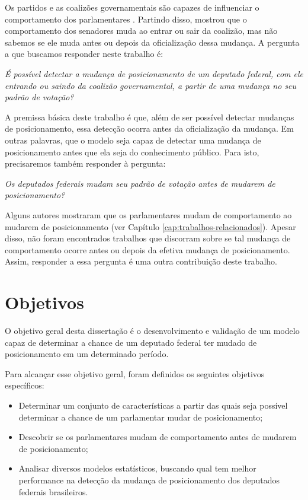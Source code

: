 Os partidos e as coalizões governamentais são capazes de influenciar o
comportamento dos parlamentares \cite{Figueiredo2001,Santos2003}. Partindo
disso,  mostrou que o comportamento dos senadores muda ao
entrar ou sair da coalizão, mas não sabemos se ele muda antes ou depois da
oficialização dessa mudança. A pergunta a que buscamos responder neste trabalho
é:

\emph{É possível detectar a mudança de posicionamento de um deputado federal,
com ele entrando ou saindo da coalizão governamental, a partir de uma mudança
no seu padrão de votação?}

A premissa básica deste trabalho é que, além de ser possível detectar mudanças
de posicionamento, essa detecção ocorra antes da oficialização da mudança. Em
outras palavras, que o modelo seja capaz de detectar uma mudança de
posicionamento antes que ela seja do conhecimento público. Para isto,
precisaremos também responder à pergunta:

\emph{Os deputados federais mudam seu padrão de votação antes de mudarem de
posicionamento?}

Alguns autores mostraram que os parlamentares mudam de comportamento ao mudarem
de posicionamento (ver Capítulo \ref{cap:trabalhos-relacionados}). Apesar
disso, não foram encontrados trabalhos que discorram sobre se tal mudança de
comportamento ocorre antes ou depois da efetiva mudança de posicionamento.
Assim, responder a essa pergunta é uma outra contribuição deste trabalho.

\section{Objetivos}

O objetivo geral desta dissertação é o desenvolvimento e validação de um modelo
capaz de determinar a chance de um deputado federal ter mudado de
posicionamento em um determinado período.

Para alcançar esse objetivo geral, foram definidos os seguintes objetivos
específicos:

\begin{itemize}
  \item Determinar um conjunto de características a partir das quais seja
    possível determinar a chance de um parlamentar mudar de posicionamento;
  \item Descobrir se os parlamentares mudam de comportamento antes de mudarem
    de posicionamento;
  \item Analisar diversos modelos estatísticos, buscando qual tem melhor
    performance na detecção da mudança de posicionamento dos deputados
    federais brasileiros.
\end{itemize}


